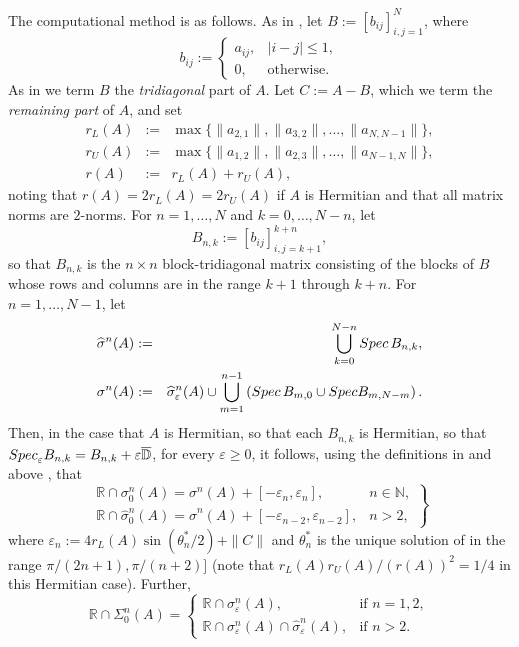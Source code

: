 \documentclass[preprint,1p,11pt]{elsarticle}
\newcommand\D{{\mathbb D}}
\newcommand\N{{\mathbb N}}
\newcommand\R{{\mathbb R}}
\newcommand\eps{{\varepsilon}}
\newcommand\Spec{{\rm Spec}\,}  %
\newcommand\Specn{{\rm Spec}}   %
\newcommand\Speps{{\rm Spec}_\eps}
\numberwithin{equation}{section}   %
\numberwithin{figure}{section}  %
\begin{document}
The computational method is as follows. As in \cite[\S1]{CWL},
let $B:=[b_{ij}]_{i,j=1}^N$, where
$$
b_{ij} := \left\{\begin{array}{ll} a_{ij}, & |i-j|\leq 1,\\ 0, & \mbox{otherwise}.\end{array}\right.
$$
As in \cite[\S1]{CWL} we term $B$ the {\it tridiagonal} part of $A$.
Let  $C:=A-B$, which we term the {\em remaining part} of $A$, and set
\begin{eqnarray} \nonumber
r_L(A) &:=& \max\{\|a_{2,1}\|,\|a_{3,2}\|,\ldots,\|a_{N,N-1}\|\},\\ \label{eq:rdefs}
 r_U(A)& :=& \max\{\|a_{1,2}\|,\|a_{2,3}\|,\ldots,\|a_{N-1,N}\|\},\\ \nonumber
r(A) &:=& r_L(A)+r_U(A),
\end{eqnarray}
noting that $r(A)=2r_L(A)=2r_U(A)$ if $A$ is Hermitian and that all matrix norms are $2$-norms.
For $n=1,\ldots,N$ and $k=0,\ldots,N-n$, let 
$$
B_{n,k}:=[b_{ij}]_{i,j=k+1}^{k+n},
$$ 
so that $B_{n,k}$ is the $n\times n$ block-tridiagonal matrix consisting of the blocks of $B$ whose rows and columns are in the range $k+1$ through $k+n$. For $n=1,\ldots,N-1$, let
\begin{eqnarray} \label{eq:sigmahat}
\widehat \sigma^n(A) &:=&\bigcup_{k=0}^{N-n}  \Spec B_{n,k}, \\ \label{eq:sigma}
\sigma^n(A) &:=& \widehat \sigma^n_{\eps}(A) \cup \bigcup_{m=1}^{n-1} \left(\Spec  B_{m,0}\cup \Specn  B_{m,N-m}\right).
\end{eqnarray}
Then, in the case that $A$ is Hermitian, so that each $B_{n,k}$ is Hermitian, so that $\Speps B_{n,k} = B_{n,k} + \eps \overline{\D}$, for every $\eps\geq 0$, it follows, using the definitions in and above \cite[(1.6)]{CWL}, that
\begin{equation} \label{eq:hatsig}
\left.\begin{array}{ll}
\R\cap \sigma_0^n(A) = \sigma^n(A) + [-\eps_n,\eps_n], & n\in \N,\\
\R\cap \widehat \sigma_0^n(A) = \widehat \sigma^n(A) + [-\eps_{n-2},\eps_{n-2}], & n>2,\end{array} \right\}
\end{equation}
where $\eps_n := 4r_L(A) \sin(\theta_n^*/2) + \|C\|$ and $\theta_n^*$ is the unique solution of \cite[(1.5)]{CWL} in the range $\pi/(2n+1),\pi/(n+2)]$ (note that $r_L(A)r_U(A)/(r(A))^2=1/4$ in this Hermitian case). Further,
\begin{equation} \label{eq:Sigma}
\R\cap \Sigma_0^n(A) =\left\{\begin{array}{ll}\R\cap \sigma^n_{\eps}(A), & \mbox{if } n = 1,2,\\
\R\cap \sigma^n_{\eps}(A) \cap \widehat \sigma^n_{\eps}(A),& \mbox{if } n> 2.\end{array} \right.
\end{equation}  
\end{document}
